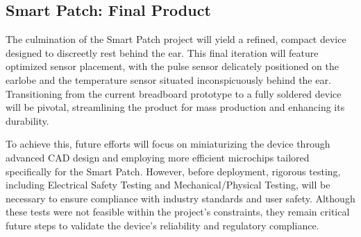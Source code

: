 \subsection{Smart Patch: Final Product}
The culmination of the Smart Patch project will yield a refined, compact device designed to discreetly rest behind the ear. This final iteration will feature optimized sensor placement, with the pulse sensor delicately positioned on the earlobe and the temperature sensor situated inconspicuously behind the ear. Transitioning from the current breadboard prototype to a fully soldered device will be pivotal, streamlining the product for mass production and enhancing its durability.

\noindent To achieve this, future efforts will focus on miniaturizing the device through advanced CAD design and employing more efficient microchips tailored specifically for the Smart Patch. However, before deployment, rigorous testing, including Electrical Safety Testing and Mechanical/Physical Testing, will be necessary to ensure compliance with industry standards and user safety. Although these tests were not feasible within the project's constraints, they remain critical future steps to validate the device's reliability and regulatory compliance.








